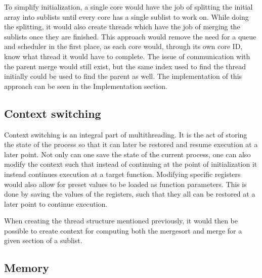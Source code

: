To simplify initialization, a single core would have the job of splitting the
initial array into sublists until every core has a single sublist to work on.
While doing the splitting, it would also create threads which have the job of
merging the sublists once they are finished. This approach would remove the need
for a queue and scheduler in the first place, as each core would, through its
own core ID, know what thread it would have to complete. The issue of
communication with the parent merge would still exist, but the same index used
to find the thread initially could be used to find the parent as well. The
implementation of this approach can be seen in the Implementation section.


\subsection{Context switching}
Context switching is an integral part of multithreading. It is the act of
storing the state of the process so that it can later be restored and resume
execution at a later point. Not only can one save the state of the current
process, one can also modify the context such that instead of continuing at the
point of initialization it instead continues execution at a target function.
Modifying specific registers would also allow for preset values to be loaded as
function parameters. This is done by saving the values of the registers, such
that they all can be restored at a later point to continue execution.

When creating the thread structure mentioned previously, it
would then be possible to create context for computing both the mergesort and
merge for a given section of a sublist.



\subsection{Memory}
